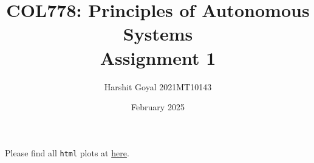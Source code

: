 \documentclass{article}
\title{COL778: Principles of Autonomous Systems\\Assignment 1}
\author{Harshit Goyal 2021MT10143}
\date{February 2025}
\begin{document}
\maketitle
\tableofcontents

Please find all \texttt{html} plots at \href{https://drive.google.com/drive/folders/1-jn52YG4mljfbpNnCjoS01RoiQahJ_YK?usp=share_link}{here}.\\




\end{document}
